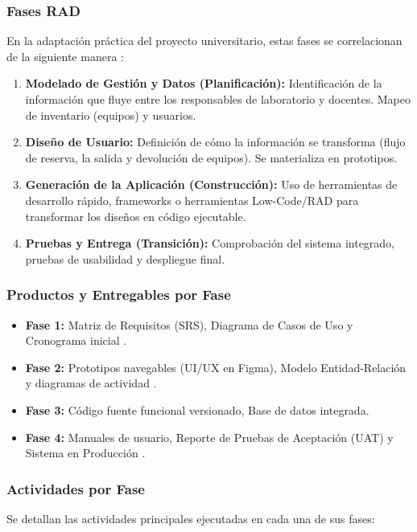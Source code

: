 \documentclass[pdflatex,sn-mathphys-num]{sn-jnl}%
\theoremstyle{thmstyleone}%
\theoremstyle{thmstyletwo}%
\theoremstyle{thmstylethree}%
\begin{document}
 \subsubsection{Fases RAD }
En la adaptación práctica del proyecto universitario, estas fases se correlacionan de la siguiente manera \cite{purnamasari_rapid_2026}:
\begin{enumerate}
	\item \textbf{Modelado de Gestión y Datos (Planificación):} Identificación de la información que fluye entre los responsables de laboratorio y docentes. Mapeo de inventario (equipos) y usuarios.
	\item \textbf{Diseño de Usuario:} Definición de cómo la información se transforma (flujo de reserva, la salida y devolución de equipos). Se materializa en prototipos.
	\item \textbf{Generación de la Aplicación (Construcción):} Uso de herramientas de desarrollo rápido, frameworks o herramientas Low-Code/RAD \cite{radvilaite_integrating_2025} para transformar los diseños en código ejecutable.
	\item \textbf{Pruebas y Entrega (Transición):} Comprobación del sistema integrado, pruebas de usabilidad y despliegue final.
\end{enumerate}
 
 \subsubsection{Productos y Entregables por Fase}
 \begin{itemize}
 	\item \textbf{Fase 1:} Matriz de Requisitos (SRS), Diagrama de Casos de Uso y Cronograma inicial \cite{purnamasari_rapid_2026}.
 	\item \textbf{Fase 2:} Prototipos navegables (UI/UX en Figma), Modelo Entidad-Relación y diagramas de actividad \cite{alvarez-pineda_implementacion_2026, purnamasari_rapid_2026}.
 	\item \textbf{Fase 3:} Código fuente funcional versionado, Base de datos integrada.
 	\item \textbf{Fase 4:} Manuales de usuario, Reporte de Pruebas de Aceptación (UAT) y Sistema en Producción \cite{purnamasari_rapid_2026}.
 \end{itemize}
 \subsubsection{Actividades por Fase}
 Se detallan las actividades principales ejecutadas en cada una de sus fases:
 
\end{document}
